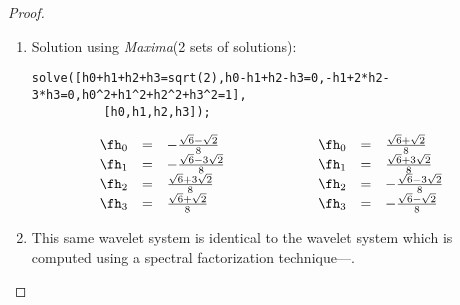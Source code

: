 \begin{proof}
\begin{enumerate}
  \item Solution using {\em Maxima}\texttrademark \hspace{1ex}(2 sets of solutions): \\
  \begin{lstlisting}[language=MuPAD,frame=single]
    solve([h0+h1+h2+h3=sqrt(2),h0-h1+h2-h3=0,-h1+2*h2-3*h3=0,h0^2+h1^2+h2^2+h3^2=1],
          [h0,h1,h2,h3]);
  \end{lstlisting}
  \[\begin{array}{rcl}
     \fh_0 &=& -\frac{\sqrt{6}- \sqrt{2}}{8} \\
     \fh_1 &=& -\frac{\sqrt{6}-3\sqrt{2}}{8} \\
     \fh_2 &=&  \frac{\sqrt{6}+3\sqrt{2}}{8} \\
     \fh_3 &=&  \frac{\sqrt{6}+ \sqrt{2}}{8} \\
    \end{array}
    \hspace{2cm}
    \begin{array}{rcl}
     \fh_0 &=&  \frac{\sqrt{6}+ \sqrt{2}}{8} \\
     \fh_1 &=&  \frac{\sqrt{6}+3\sqrt{2}}{8} \\
     \fh_2 &=& -\frac{\sqrt{6}-3\sqrt{2}}{8} \\
     \fh_3 &=& -\frac{\sqrt{6}- \sqrt{2}}{8}
    \end{array}\]

  \item This same wavelet system is identical to the  wavelet system
        which is computed using a spectral factorization technique---.
\end{enumerate}


\end{proof}




